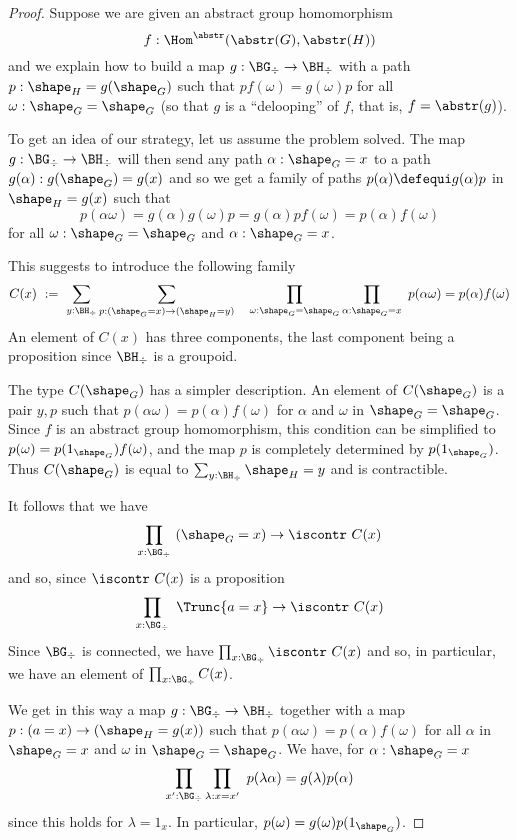 \begin{proof}
  Suppose we are given an abstract group homomorphism
$$f:\Hom^\abstr(\abstr(G),\abstr(H))$$
and we explain how to build a map $g:\BG_\div \rightarrow \BH_\div$ with
a path $p:\shape_H = g(\shape_G)$ such that $p f(\omega) = g(\omega) p$
for all $\omega:\shape_G = \shape_G$ (so that $g$ is a ``delooping'' of $f$, that is, $f=\abstr(g)$).

To get an idea of our strategy, let us assume the problem solved. The map $g:\BG_\div\rightarrow \BH_\div$
will then send any path $\alpha:{\shape_G} = x$ to a path $g(\alpha):g({\shape_G}) = g(x)$
and so we get a family of paths $p(\alpha) \defequi g(\alpha) p$ in ${\shape_H} = g(x)$ such that
$$p(\alpha\omega) = g(\alpha)g(\omega)p
  = g(\alpha)pf(\omega) = p(\alpha)f(\omega)$$
for all $\omega:{\shape_G} = {\shape_G}$ and $\alpha : {\shape_G} = x$.

This suggests to introduce the following family
$$
C(x)~:=~ \sum_{y:\BH_\div}\sum_{p:({\shape_G}=x)\rightarrow ({\shape_H} = y)}~~~\prod_{\omega:{\shape_G}={\shape_G}}\prod_{\alpha:{\shape_G}=x}~
 p(\alpha\omega) = p(\alpha)f(\omega)
$$
 An element of $C(x)$ has three components, the last component being
 a proposition since $\BH_\div$ is a groupoid.

 The type $C({\shape_G})$ has a simpler description. An element of $C({\shape_G})$ is
 a pair $y,p$ such that $p(\alpha\omega) = p(\alpha)f(\omega)$ for
 $\alpha$ and $\omega$ in ${\shape_G}={\shape_G}$.
 Since $f$ is an abstract group homomorphism, this condition
 can be simplified to $p(\omega) = p(1_{\shape_G})f(\omega)$, and the map $p$
 is completely determined by $p(1_{\shape_G})$.
 Thus $C({\shape_G})$ is equal to $\sum_{y:\BH_\div}{\shape_H} = y$ and is contractible.


 It follows that we have
 $$
 \prod_{x:\BG_\div}~ ({\shape_G} = x)\rightarrow\iscontr~ C(x)
 $$
and so, since $\iscontr~C(x)$ is a proposition
 $$
 \prod_{x:\BG_\div}~ \Trunc{a = x}\rightarrow\iscontr~ C(x)
 $$
 Since $\BG_\div$ is connected, we have
 $\prod_{x:\BG_\div}\iscontr~ C(x)$
 and so, in particular, we have an element of $\prod_{x:\BG_\div}C(x)$.

 We get in this way a map $g:\BG_\div\rightarrow \BH_\div$
 together with a map $p:(a=x)\rightarrow ({\shape_H} = g(x))$ such that
 $p (\alpha\omega) = p(\alpha) f(\omega)$
 for all $\alpha$ in ${\shape_G}=x$ and $\omega$ in ${\shape_G}={\shape_G}$.
We have, for $\alpha:{\shape_G}=x$
$$\prod_{x':\BG_\div}\prod_{\lambda:x=x'}~p(\lambda\alpha) = g(\lambda)p(\alpha)$$
since this holds for $\lambda = 1_x$.
In particular, $p(\omega) = g(\omega)p(1_{\shape_G})$.


\end{proof}

